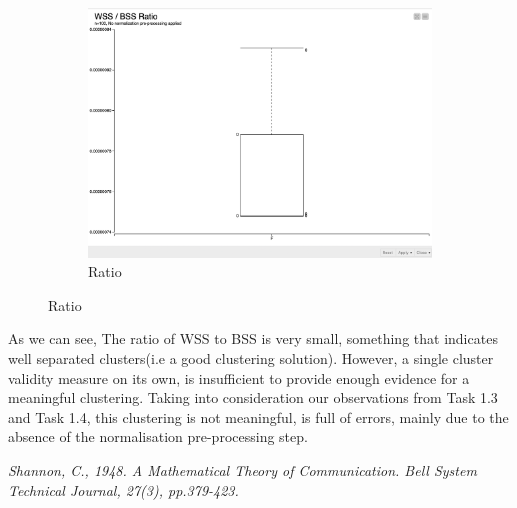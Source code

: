 \documentclass[12pt]{article}
\begin{document}
\begin{figure}[H]
\begin{subfigure}{0.4\textwidth}
							\includegraphics[width=\textwidth]{res/WSS-BSS-Ratio}
		 					\caption{Ratio}
		 					\label{fig:third}
		 				\end{subfigure}
		 				\label{fig:figures}
		 			\end{figure}
	 				As we can see, The ratio of WSS to BSS is very small, something that indicates well separated clusters(i.e a good clustering solution). However, a single cluster validity measure on its own, is insufficient to provide enough evidence for a meaningful clustering. Taking into consideration our observations from Task 1.3 and Task 1.4, this clustering \cite{???}is not meaningful, is full of
	 				errors, mainly due to the absence of the normalisation pre-processing step.
	 				
		
	
	
	 
	
	
		
	
	\pagebreak
	\begin{thebibliography}{1}	
		\textit{Shannon, C., 1948. A Mathematical Theory of Communication. Bell System Technical Journal, 27(3), pp.379-423.}
		
	\end{thebibliography}
\end{document}
